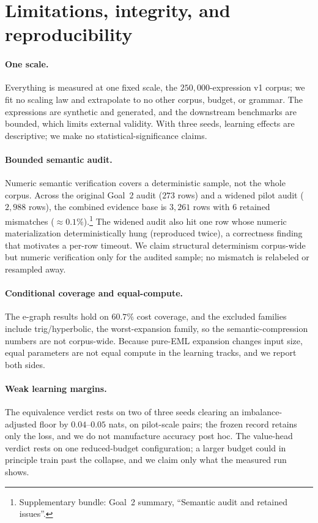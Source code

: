 \documentclass[11pt]{article}
\newcommand{\anchor}[1]{\footnote{#1}}
\begin{document}
\section{Limitations, integrity, and reproducibility}
\label{sec:limits}

\paragraph{One scale.} Everything is measured at one fixed scale, the
$250{,}000$-expression v1 corpus; we fit no scaling law and extrapolate to no
other corpus, budget, or grammar. The
expressions are synthetic and generated, and the downstream benchmarks are
bounded, which limits external validity. With three seeds, learning effects are
descriptive; we make no statistical-significance claims.

\paragraph{Bounded semantic audit.} Numeric semantic verification covers a
deterministic sample, not the whole corpus. Across the original Goal~2 audit
($273$ rows) and a widened pilot audit ($2{,}988$ rows), the combined evidence
base is $3{,}261$ rows with $6$ retained mismatches
(${\approx}0.1\%$).\anchor{Supplementary bundle: Goal~2 summary, ``Semantic
audit and retained issues''.} The widened audit also hit one row whose numeric
materialization deterministically hung (reproduced twice), a correctness
finding that motivates a per-row timeout. We claim structural
determinism corpus-wide but numeric verification only for the audited sample; no
mismatch is relabeled or resampled away.

\paragraph{Conditional coverage and equal-compute.} The e-graph results hold on
$60.7\%$ cost coverage, and the excluded families include trig/hyperbolic, the
worst-expansion family, so the semantic-compression numbers are not corpus-wide.
Because pure-EML expansion changes input size, equal parameters are not equal
compute in the learning tracks, and we report both sides.

\paragraph{Weak learning margins.} The equivalence verdict rests on two of three
seeds clearing an imbalance-adjusted floor by $0.04$--$0.05$ nats, on
pilot-scale pairs; the frozen record retains only the loss, and we do not
manufacture accuracy post hoc. The
value-head verdict rests on one reduced-budget configuration; a larger budget
could in principle train past the collapse, and we claim only what the measured
run shows.
\end{document}
